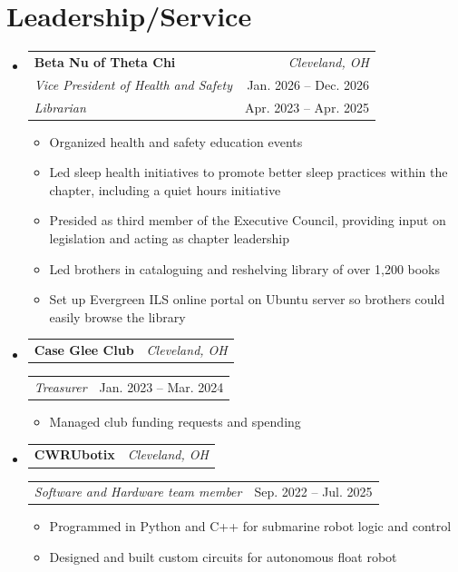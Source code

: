 \documentclass[letterpaper,11pt]{article}
\makeatletter
\newcommand{\resumeItem}[1]{
  \item\small{
    {#1 \vspace{-2pt}}
  }
}
\newcommand{\resumeLeadershipHeader}[2]{
  \item
    \begin{tabular*}{0.97\textwidth}[t]{l@{\extracolsep{\fill}}r}
      \textbf{#1} & \textit{\small #2} \\
    \end{tabular*}\vspace{-7pt}
}
\newcommand{\resumeLeadershipSubheading}[2]{
  \vspace{3pt}
  \begin{tabular*}{0.97\textwidth}[t]{l@{\extracolsep{\fill}}r}
    \textit{\small #1} & \small #2 \\
  \end{tabular*}\vspace{-5pt}
}
\newcommand{\resumeMultiRoleHeader}[6]{
  \item
    \begin{tabular*}{0.97\textwidth}[t]{l@{\extracolsep{\fill}}r}
      \textbf{#1} & \textit{\small #2} \\
      \textit{\small #3} & \small #4 \\
      \textit{\small #5} & \small #6 \\
    \end{tabular*}\vspace{-5pt}
}
\newcommand{\resumeSubHeadingListStart}{\begin{itemize}[leftmargin=0.15in, label={}]}
\newcommand{\resumeSubHeadingListEnd}{\end{itemize}}
\newcommand{\resumeItemListStart}{\begin{itemize}}
\newcommand{\resumeItemListEnd}{\end{itemize}\vspace{-5pt}}
\makeatother
\begin{document}
\section{Leadership/Service}
\resumeSubHeadingListStart

  \resumeMultiRoleHeader
    {Beta Nu of Theta Chi}{Cleveland, OH}
    {Vice President of Health and Safety}{Jan. 2026 -- Dec. 2026}
    {Librarian} {Apr. 2023 -- Apr. 2025}
    \resumeItemListStart
      \resumeItem{Organized health and safety education events}
      \resumeItem{Led sleep health initiatives to promote better sleep practices within the chapter, including a quiet hours initiative}
      \resumeItem{Presided as third member of the Executive Council, providing input on legislation and acting as chapter leadership}
      \resumeItem{Led brothers in cataloguing and reshelving library of over 1,200 books}
      \resumeItem{Set up Evergreen ILS online portal on Ubuntu server so brothers could easily browse the library}
    \resumeItemListEnd

  \resumeLeadershipHeader{Case Glee Club}{Cleveland, OH}

    \resumeLeadershipSubheading{Treasurer}{Jan. 2023 -- Mar. 2024}
    \resumeItemListStart
      \resumeItem{Managed club funding requests and spending}
    \resumeItemListEnd

  \resumeLeadershipHeader{CWRUbotix}{Cleveland, OH}

    \resumeLeadershipSubheading{Software and Hardware team member}{Sep. 2022 -- Jul. 2025}
    \resumeItemListStart
      \resumeItem{Programmed in Python and C++ for submarine robot logic and control}
      \resumeItem{Designed and built custom circuits for autonomous float robot}
    \resumeItemListEnd

\resumeSubHeadingListEnd

\end{document}

